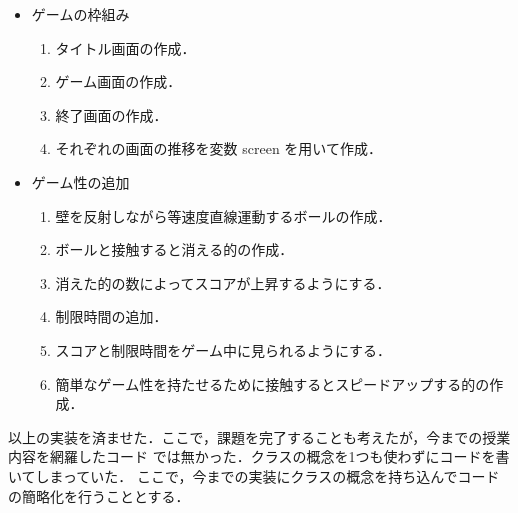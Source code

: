 \documentclass[12pt,a4j]{jarticle}
\begin{document}
\begin{itemize}
  \item ゲームの枠組み
  \begin{enumerate}
    \item タイトル画面の作成．
    \item ゲーム画面の作成．
    \item 終了画面の作成．
    \item それぞれの画面の推移を変数 screen を用いて作成．
  \end{enumerate}
  \item ゲーム性の追加
  \begin{enumerate}
    \item 壁を反射しながら等速度直線運動するボールの作成．
    \item ボールと接触すると消える的の作成．
    \item 消えた的の数によってスコアが上昇するようにする．
    \item 制限時間の追加．
    \item スコアと制限時間をゲーム中に見られるようにする．
    \item 簡単なゲーム性を持たせるために接触するとスピードアップする的の作成．
  \end{enumerate}
\end{itemize}

以上の実装を済ませた．ここで，課題を完了することも考えたが，今までの授業内容を網羅したコード
では無かった．クラスの概念を1つも使わずにコードを書いてしまっていた．
ここで，今までの実装にクラスの概念を持ち込んでコードの簡略化を行うこととする．
\end{document}
